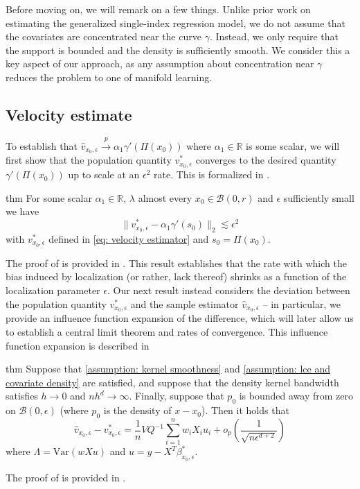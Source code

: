 \documentclass[11pt]{article}
\begin{document}
Before moving on, we will remark on a few things. Unlike prior work on estimating the generalized single-index regression model, we do not assume that the covariates are concentrated near the curve $\gamma$. Instead, we only require that the support is bounded and the density is sufficiently smooth. We consider this a key aspect of our approach, as any assumption about concentration near $\gamma$ reduces the problem to one of manifold learning. 

\subsection{Velocity estimate}

To establish that $\hat{v}_{x_0, \epsilon} \overset{p}{\rightarrow} \alpha_1\gamma'(\Pi(x_0))$ where $\alpha_1 \in \mathbb{R}$ is some scalar, we will first show that the population quantity $v^*_{x_0, \epsilon}$ converges to the desired quantity $\gamma'(\Pi(x_0))$ up to scale at an $\epsilon^2$ rate. This is formalized in .

\begin{restatable}{thm}{}\label{thm: population prop}
    For some scalar $\alpha_1 \in \mathbb{R}$, $\lambda$ almost every $x_0 \in \mathcal{B}(0, r)$ and $\epsilon$ sufficiently small we have 
    \[\|v^*_{x_0, \epsilon} - \alpha_1\gamma'(s_0)\|_2 \lesssim \epsilon^2\]
    with $v^*_{x_0, \epsilon}$ defined in \cref{eq: velocity estimator} and $s_0 = \Pi(x_0)$.
\end{restatable}

The proof of  is provided in . This result establishes that the rate with which the bias induced by localization (or rather, lack thereof) shrinks as a function of the localization parameter $\epsilon$. Our next result instead considers the deviation between the population quantity $v^*_{x_0, \epsilon}$ and the sample estimator $\hat v_{x_0, \epsilon}$ -- in particular, we provide an influence function expansion of the difference, which will later allow us to establish a central limit theorem and rates of convergence. This influence function expansion is described in 

\begin{restatable}{thm}{} \label{thm: decomposition for beta}
    Suppose that \cref{assumption: kernel smoothness} and \cref{assumption: lce and covariate density} are satisfied, and suppose that the density kernel bandwidth satisfies $h \rightarrow 0$ and $nh^d \rightarrow \infty$. Finally, suppose that $p_0$ is bounded away from zero on $\mathcal{B}(0, \epsilon)$ (where $p_0$ is the density of $x - x_0$). Then it holds that
    \[\hat{v}_{x_0, \epsilon} - v^*_{x_0, \epsilon} = \frac{1}{n}VQ^{-1}\sum_{i = 1}^nw_iX_iu_i +o_p\left(\frac{1}{\sqrt{n\epsilon^{d+2}}}\right)\]
    where 
    $\Lambda = \text{Var}(wXu)$
    and $u = y - X^T\beta_{x_0, \epsilon}^*$.
\end{restatable}
The proof of  is provided in . 
\end{document}
